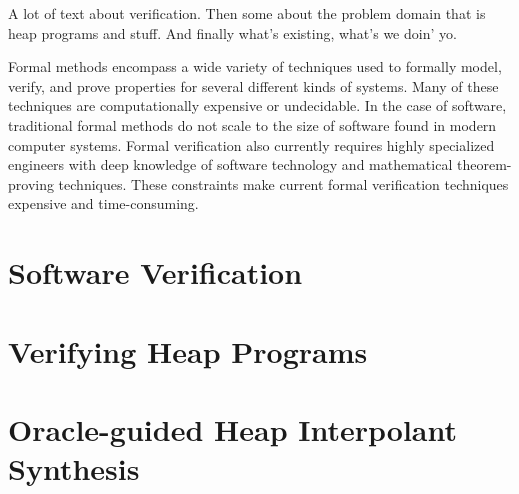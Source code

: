 \label{ch:intro}

A lot of text about verification. Then some about the problem domain that is heap programs and stuff. And finally what's existing, what's we doin' yo.

Formal methods encompass a wide variety of techniques used to formally model, verify, and prove properties for several different kinds of systems. Many of these techniques are computationally expensive or undecidable. In the case of software, traditional formal methods do not scale to the size of software found in modern computer systems. Formal verification also currently requires highly specialized engineers with deep knowledge of software technology and mathematical theorem-proving techniques. These constraints make current formal verification techniques expensive and time-consuming.

\section{Software Verification}

\section{Verifying Heap Programs}

\section{Oracle-guided Heap Interpolant Synthesis}